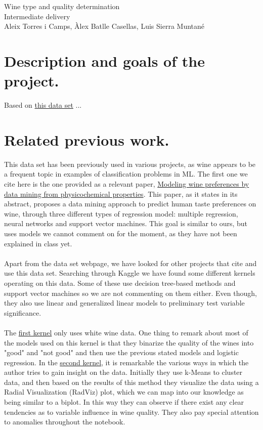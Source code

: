 \documentclass[10pt]{article}
\begin{document}
\begingroup
  \centering
  \Huge Wine type and quality determination \\
  \vskip 0.35cm
  \LARGE Intermediate delivery\\
  \vskip 0.25cm
  \large Aleix Torres i Camps, Àlex Batlle Casellas, Luis Sierra Muntané\\[1.5em]
\endgroup


\section{Description and goals of the project.}
Based on \href{http://archive.ics.uci.edu/ml/datasets/Wine+Quality}{this data set} ...

\section{Related previous work.}
This data set has been previously used in various projects, as wine appears to be a frequent topic in examples of classification problems in ML. The first one we cite here is the one provided as a relevant paper, \href{https://www.sciencedirect.com/science/article/pii/S0167923609001377?via\%3Dihub}{Modeling wine preferences by data mining from physicochemical properties}. This paper, as it states in its abstract, proposes a data mining approach to predict human taste preferences on wine, through three different types of regression model: multiple regression, neural networks and support vector machines. This goal is similar to ours, but uses models we cannot comment on for the moment, as they have not been explained in class yet. \\ \ \\
Apart from the data set webpage, we have looked for other projects that cite and use this data set. Searching through Kaggle we have found some different kernels operating on this data. Some of these use decision tree-based methods and support vector machines so we are not commenting on them either. Even though, they also use linear and generalized linear models to preliminary test variable significance. \\ \ \\
The \href{https://www.kaggle.com/indra90/predicting-white-wine-quality}{first kernel} only uses white wine data. One thing to remark about most of the models used on this kernel is that they binarize the quality of the wines into "good" and "not good" and then use the previous stated models and logistic regression.
In the \href{https://www.kaggle.com/conradws/how-good-is-this-wine-m-l-for-quality-control}{second kernel}, it is remarkable the various ways in which the author tries to gain insight on the data. Initially they use k-Means to cluster data, and then based on the results of this method they visualize the data using a Radial Visualization (RadViz) plot, which we can map into our knowledge as being similar to a biplot. In this way they can observe if there exist any clear tendencies as to variable influence in wine quality. They also pay special attention to anomalies throughout the notebook. \\ \ \\
\end{document}
